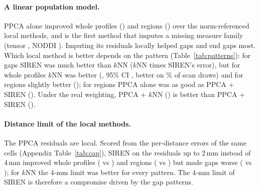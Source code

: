 \documentclass[11pt]{article}
\begin{document}
\paragraph{A linear population model.} PPCA alone improved whole profiles (\rPpcaWhole) and regions (\rPpcaRegion) over
the norm-referenced local methods, and is the first method that imputes a missing measure family (tensor \rPpcaWdti,
NODDI \rPpcaWnoddi). Imputing its residuals locally helped gaps and end gaps most. Which local method is better depends
on the pattern (Table~\ref{tab:patterns}): for gaps SIREN was much better than $k$NN ($k$NN \pcAGap{} times SIREN's
error), but for whole profiles $k$NN was better (\pcAWhole, 95\% CI \pcAWholeCi, better on \pcAWholeBetter\% of scan
draws) and for regions slightly better (\pcARegion); for regions PPCA alone was as good as PPCA + SIREN (\pcBRegion).
Under the real weighting, PPCA + $k$NN (\rwPpcaKnn) is better than PPCA + SIREN (\rwDefault).

\begin{table}[t]
\centering\footnotesize
\caption{Pattern-specific paired contrasts (geometric mean ratio of per-scan errors, compared / reference, with the
95\% subject-bootstrap CI; 162 scan $\times$ seed pairs).}\label{tab:patterns}
\resizebox{\textwidth}{!}{}
\end{table}

\paragraph{Distance limit of the local methods.} The PPCA residuals are local. Scored from the per-distance errors of
the same cells (Appendix Table~\ref{tab:cap}), SIREN on the residuals up to 2\,mm instead of 4\,mm improved whole profiles
(\capSirenTwoWhole{} vs \capSirenFourWhole) and regions (\capSirenTwoRegion{} vs \capSirenFourRegion) but made gaps worse
(\capSirenTwoGap{} vs \capSirenFourGap); for $k$NN the 4-mm limit was better for every pattern. The 4-mm limit of SIREN is
therefore a compromise driven by the gap patterns.
\end{document}
